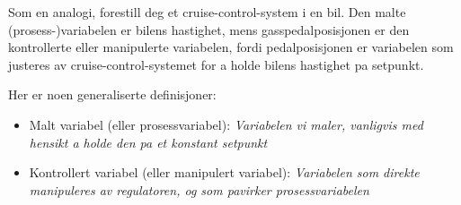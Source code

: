 Som en analogi, forestill deg et cruise-control-system i en bil.  Den malte (prosess-)variabelen er bilens hastighet, mens gasspedalposisjonen er den kontrollerte eller manipulerte variabelen, fordi pedalposisjonen er variabelen som justeres av cruise-control-systemet for a holde bilens hastighet pa setpunkt.

Her er noen generaliserte definisjoner:

\begin{itemize}
\item{} Malt variabel (eller prosessvariabel): {\it Variabelen vi maler, vanligvis med hensikt a holde den pa et konstant setpunkt}
\vskip 5pt
\item{} Kontrollert variabel (eller manipulert variabel): {\it Variabelen som direkte manipuleres av regulatoren, og som pavirker prosessvariabelen}
\end{itemize}












